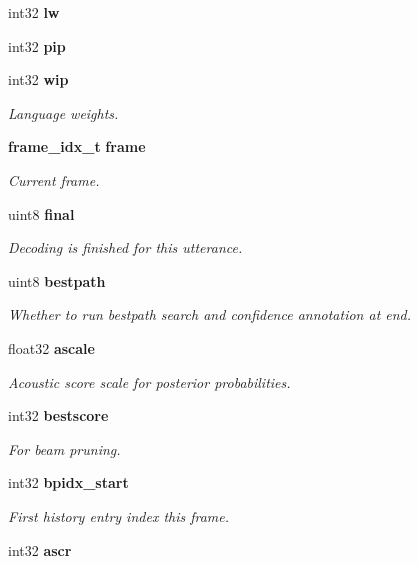 \begin{DoxyCompactItemize}
\mbox{\label{structfsg__search__s_a77c1f7f228ca66e48fb05e1ac2b2714a}} 
int32 {\bfseries lw}
\item 
\mbox{\label{structfsg__search__s_a2163d2c02c2dfe84a83c10fdb2d330a3}} 
int32 {\bfseries pip}
\item 
\mbox{\label{structfsg__search__s_ae9ddc3b50d0f164926392f8ab4b019a0}} 
int32 \textbf{ wip}
\begin{DoxyCompactList}\small\item\em Language weights. \end{DoxyCompactList}\item 
\textbf{ frame\+\_\+idx\+\_\+t} \textbf{ frame}
\begin{DoxyCompactList}\small\item\em Current frame. \end{DoxyCompactList}\item 
uint8 \textbf{ final}
\begin{DoxyCompactList}\small\item\em Decoding is finished for this utterance. \end{DoxyCompactList}\item 
uint8 \textbf{ bestpath}
\begin{DoxyCompactList}\small\item\em Whether to run bestpath search and confidence annotation at end. \end{DoxyCompactList}\item 
float32 \textbf{ ascale}
\begin{DoxyCompactList}\small\item\em Acoustic score scale for posterior probabilities. \end{DoxyCompactList}\item 
\mbox{\label{structfsg__search__s_a52880ad440412d76f7aae7e05977ba4b}} 
int32 \textbf{ bestscore}
\begin{DoxyCompactList}\small\item\em For beam pruning. \end{DoxyCompactList}\item 
\mbox{\label{structfsg__search__s_a24d59609008ac132dca256d36a89f9c8}} 
int32 \textbf{ bpidx\+\_\+start}
\begin{DoxyCompactList}\small\item\em First history entry index this frame. \end{DoxyCompactList}\item 
\mbox{\label{structfsg__search__s_aac3c130a5777edd2a227fd064eaefbf2}} 
int32 {\bfseries ascr}

\end{DoxyCompactItemize}
